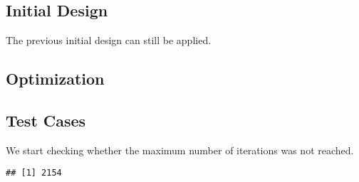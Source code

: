 \documentclass[]{book}
\newenvironment{Shaded}{\begin{snugshade}}{\end{snugshade}}
\newcommand{\DataTypeTok}[1]{\textcolor[rgb]{0.13,0.29,0.53}{#1}}
\newcommand{\DecValTok}[1]{\textcolor[rgb]{0.00,0.00,0.81}{#1}}
\newcommand{\KeywordTok}[1]{\textcolor[rgb]{0.13,0.29,0.53}{\textbf{#1}}}
\newcommand{\NormalTok}[1]{#1}
\newcommand{\OperatorTok}[1]{\textcolor[rgb]{0.81,0.36,0.00}{\textbf{#1}}}
\newcommand{\StringTok}[1]{\textcolor[rgb]{0.31,0.60,0.02}{#1}}
\begin{document}
\hypertarget{initial-design-4}{%
\subsection{Initial Design}\label{initial-design-4}}

The previous initial design can still be applied.

\hypertarget{optimization-5}{%
\subsection{Optimization}\label{optimization-5}}

\begin{Shaded}
\end{Shaded}

\hypertarget{test-cases-5}{%
\subsection{Test Cases}\label{test-cases-5}}

We start checking whether the maximum number of iterations was not reached.

\begin{Shaded}
\end{Shaded}

\begin{verbatim}
## [1] 2154
\end{verbatim}

\begin{Shaded}
\end{Shaded}
\end{document}
